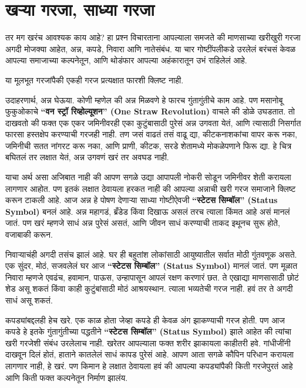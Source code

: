\chapter{खऱ्या गरजा, साध्या गरजा}

तर मग खरंच आवश्यक काय आहे? हा प्रश्न विचारताना आपल्याला समजते की माणसाच्या खरीखुरी गरजा अगदी मोजक्या आहेत,  अन्न, कपडे, निवारा आणि नातेसंबंध. या चार गोष्टींपलीकडे उरलेलं बरंचसं केवळ आपल्या समाजाच्या कल्पनेतून, आणि थोडंफार आपल्या अहंकारातून उभं राहिलेलं आहे.

या मूलभूत गरजांपैकी एकही गरज प्रत्यक्षात फारशी क्लिष्ट नाही.

उदाहरणार्थ, अन्न घेऊया. कोणी म्हणेल की अन्न मिळवणे हे फारच गुंतागुंतीचे काम आहे. पण मसानोबू फुकुओकाचे \textbf{“वन स्ट्रॉ रिव्होल्यूशन” (One Straw Revolution)} वाचले की डोळे उघडतात. तो दाखवतो की फक्त एक एकर जमिनीवरही एका कुटुंबासाठी पुरेसं अन्न उगवता येतं, आणि त्यासाठी निसर्गात फारसा हस्तक्षेप करण्याची गरजही नाही. तण जसं वाढतं तसं वाढू द्या, कीटकनाशकांचा वापर करू नका, जमिनीची सतत नांगरट करू नका, आणि प्राणी, कीटक, सरडे शेतामध्ये मोकळेपणाने फिरू द्या. हे चित्र बघितलं तर लक्षात येतं,  अन्न उगवणं खरं तर अवघड नाही.

याचा अर्थ असा अजिबात नाही की आपण सगळे उद्या आपापली नोकरी सोडून जमिनीवर शेती करायला लागणार आहोत. पण इतकं लक्षात ठेवायला हरकत नाही की आपल्या अन्नाची खरी गरज समाजाने क्लिष्ट करून टाकली आहे. आज अन्न हे पोषण देणाऱ्या साध्या गोष्टीऐवजी \textbf{“स्टेटस सिम्बॉल” (Status Symbol)} बनलं आहे. अन्न महागडं, ब्रँडेड किंवा दिखाऊ असलं तरच त्याला किंमत आहे असं मानलं जातं. पण खरं म्हणजे साधं अन्न पुरेसं असतं, आणि जीवन साधं करण्याची ताकद इथूनच सुरू होते,  वजाबाकी करून.

निवाऱ्याचंही अगदी तसंच झालं आहे. घर ही बहुतांश लोकांसाठी आयुष्यातील सर्वात मोठी गुंतवणूक असते. एक सुंदर, मोठं, सजवलेलं घर आज \textbf{“स्टेटस सिम्बॉल” (Status Symbol)} मानलं जातं. पण मूळात निवारा म्हणजे एवढंच,  हवामान, पाऊस, उन्हापासून आपलं रक्षण करणारं छत. ते एखाद्या माणसासाठी छोटं शेड असू शकतं किंवा काही कुटुंबांसाठी मोठं आश्रयस्थान. त्याला भव्यतेची गरज नाही. हवं तर ते अगदी साधं असू शकतं.

कपड्यांबद्दलही हेच खरे. एक काळ होता जेव्हा कपडे ही केवळ अंग झाकण्याची गरज होती. पण आज कपडे हे इतके गुंतागुंतीच्या पद्धतीने \textbf{“स्टेटस सिम्बॉल” (Status Symbol)} झाले आहेत की त्यांचा खरी गरजेशी संबंध उरलेलाच नाही. खरेतर आपल्याला फक्त शरीर झाकायला काहीतरी हवे. गांधीजींनी दाखवून दिलं होतं,  हाताने कातलेलं साधं कापड पुरेसं आहे. आपण आता सगळे कौपिन परिधान करायला लागणार नाही, हे खरं. पण किमान हे लक्षात ठेवायला हवं की आपल्या कपड्यांपैकी किती गरजेपुरतं आहे आणि किती फक्त कल्पनेतून निर्माण झालंय.

